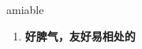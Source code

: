 
\begin{frame}
{\huge amiable}
\begin{center}
\begin{enumerate}\Large
  \item \textbf{好脾气，友好易相处的}
\end{enumerate}
\end{center}
\end{frame}
